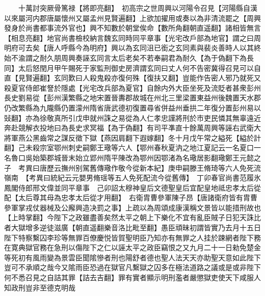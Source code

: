 　　十萬討突厥骨篤禄【將即亮翻】　初高宗之世周興以河陽令召見【河陽縣自漢以來屬河内郡唐屬懷州又屬孟州見賢遍翻】上欲加擢用或奏以為非清流罷之【周興發身於尚書都事流外官也】興不知數於朝堂俟命【數所角翻朝直遥翻】諸相皆無言【相息亮翻】地官尚書檢校納言魏玄同時同平章事【光宅改戶部為地官】謂之曰周明府可去矣【唐人呼縣今為明府】興以為玄同沮已銜之玄同素與裴炎善時人以其終始不渝謂之耐久朋周興奏誣玄同言太后老矣不若奉嗣君為耐久【為于偽翻下為長同】太后怒閏月甲午賜死于家監刑御史房濟謂玄同曰丈人何不告密冀得召見可以自直【見賢遍翻】玄同歎曰人殺鬼殺亦復何殊【復扶又翻】豈能作告密人邪乃就死又殺夏官侍郎崔詧於隱處【光宅改兵部為夏官】自餘内外大臣坐死及流貶者甚衆彭州長史劉易從【彭州漢繁縣之地宋置晉夀郡故城在州北三里梁置東益州後魏置天水郡仍改繁縣為九隴縣仍置濛州隋省唐武德初復置尋省併益州垂拱二年復分置彭州易以䜴翻】亦為徐敬真所引戊申就州誅之易從為人仁孝忠謹將刑於市吏民憐其無辜遠近奔赴競解衣投地曰為長史求冥福【為于偽翻】有司平凖直十餘萬周興等誣右武衛大將軍燕公黑齒常之謀反徵下獄【燕因肩翻下遐嫁翻】冬十月戊午常之縊死【縊於計翻】己未殺宗室鄂州刺史嗣鄭王璥等六人【鄂州春秋夏汭之地江夏記云一名夏口一名魯口吳始築郡城晉末始立郢州隋平陳改為鄂州因鄂渚為名璥居影翻璥鄭王元懿之子　考異曰唐歷云撫州别駕舊傳璥作敬今從新本紀】庚申嗣滕王脩琦等六人免死流嶺南　【考異曰統紀云元嬰男脩瑶等五人免死配流今從舊傳】　丁卯春官尚書范履氷鳳閣侍郎邢文偉並同平章事　己卯詔太穆神皇后文德聖皇后宜配皇地祗忠孝太后從配【太后尊其母為忠孝太后從才用翻】　右衛胄曹參軍陳子昂【唐諸衛府皆有胄曹參軍掌戎仗器械及公廨興造决罰之事】上疏以為周頌成康漢稱文景皆以能措刑故也【上時掌翻】今陛下之政雖盡善矣然太平之朝上下樂化不宜有亂臣賊子日犯天誅比者大獄增多逆徒滋廣【朝直遥翻樂音洛比毗至翻】愚臣頑昧初謂皆實乃去月十五日陛下特察繫囚李珍等無罪百僚慶悦皆賀聖明臣乃知亦有無罪之人挂於踈網者陛下務在寛典獄官務在急刑以傷陛下之仁以誣太平之政臣竊恨之又九月二十一日勑免楚金等死初有風雨變為景雲臣聞隂慘者刑也陽舒者德也聖人法天天亦助聖天意如此陛下豈可不承順之哉今又隂雨臣恐過在獄官凡繫獄之囚多在極法道路之議或是或非陛下何不悉召見之自詰其罪【詰去吉翻】罪有實者顯示明刑濫者嚴懲獄吏使天下咸服人知政刑豈非至德克明哉

